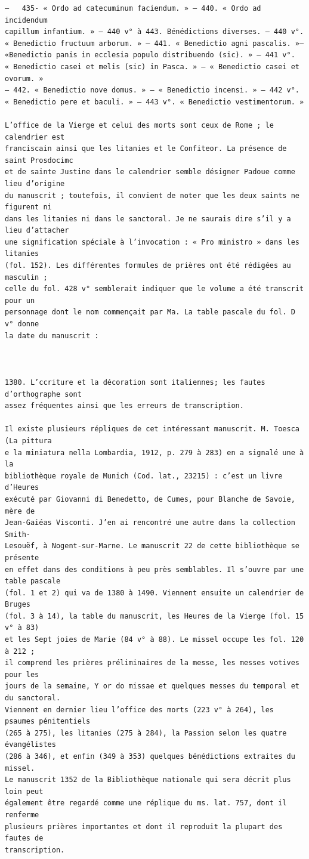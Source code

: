 \documentclass[a4paper,12pt,twoside]{book}
\begin{document}
\begin{verbatim}
—	435- « Ordo ad catecuminum faciendum. » — 440. « Ordo ad incidendum 
capillum infantium. » — 440 v° à 443. Bénédictions diverses. — 440 v°.
« Benedictio fructuum arborum. » — 441. « Benedictio agni pascalis. »— 
«Benedictio panis in ecclesia populo distribuendo (sic). » — 441 v°.
« Benedictio casei et melis (sic) in Pasca. » — « Benedictio casei et ovorum. »
— 442. « Benedictio nove domus. » — « Benedictio incensi. » — 442 v°. 
« Benedictio pere et baculi. » — 443 v°. « Benedictio vestimentorum. »

L’office de la Vierge et celui des morts sont ceux de Rome ; le calendrier est 
franciscain ainsi que les litanies et le Confiteor. La présence de saint Prosdocimc 
et de sainte Justine dans le calendrier semble désigner Padoue comme lieu d’origine
du manuscrit ; toutefois, il convient de noter que les deux saints ne figurent ni 
dans les litanies ni dans le sanctoral. Je ne saurais dire s’il y a lieu d’attacher
une signification spéciale à l’invocation : « Pro ministro » dans les litanies 
(fol. 152). Les différentes formules de prières ont été rédigées au masculin ; 
celle du fol. 428 v° semblerait indiquer que le volume a été transcrit pour un
personnage dont le nom commençait par Ma. La table pascale du fol. D v° donne 
la date du manuscrit :



1380. L’ccriture et la décoration sont italiennes; les fautes d’orthographe sont 
assez fréquentes ainsi que les erreurs de transcription.

Il existe plusieurs répliques de cet intéressant manuscrit. M. Toesca (La pittura 
e la miniatura nella Lombardia, 1912, p. 279 à 283) en a signalé une à la 
bibliothèque royale de Munich (Cod. lat., 23215) : c’est un livre d’Heures 
exécuté par Giovanni di Benedetto, de Cumes, pour Blanche de Savoie, mère de 
Jean-Gaiéas Visconti. J’en ai rencontré une autre dans la collection Smith-
Lesouëf, à Nogent-sur-Marne. Le manuscrit 22 de cette bibliothèque se présente 
en effet dans des conditions à peu près semblables. Il s’ouvre par une table pascale 
(fol. 1 et 2) qui va de 1380 à 1490. Viennent ensuite un calendrier de Bruges 
(fol. 3 à 14), la table du manuscrit, les Heures de la Vierge (fol. 15 v° à 83)
et les Sept joies de Marie (84 v° à 88). Le missel occupe les fol. 120 à 212 ; 
il comprend les prières préliminaires de la messe, les messes votives pour les 
jours de la semaine, Y or do missae et quelques messes du temporal et du sanctoral.
Viennent en dernier lieu l’office des morts (223 v° à 264), les psaumes pénitentiels 
(265 à 275), les litanies (275 à 284), la Passion selon les quatre évangélistes 
(286 à 346), et enfin (349 à 353) quelques bénédictions extraites du missel. 
Le manuscrit 1352 de la Bibliothèque nationale qui sera décrit plus loin peut 
également être regardé comme une réplique du ms. lat. 757, dont il renferme 
plusieurs prières importantes et dont il reproduit la plupart des fautes de 
transcription.


\end{verbatim}
\end{document}
